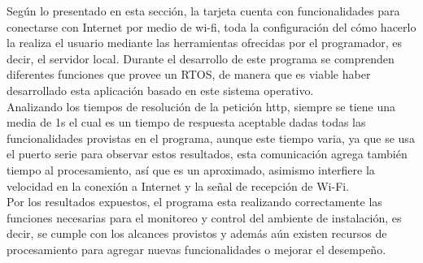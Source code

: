 Según lo presentado en esta sección, la tarjeta cuenta con funcionalidades para conectarse con Internet por medio de wi-fi, toda la configuración del cómo hacerlo la realiza el usuario mediante las herramientas ofrecidas por el programador, es decir, el servidor local. Durante el desarrollo de este programa se comprenden diferentes funciones que provee un RTOS, de manera que es viable haber desarrollado esta aplicación basado en este sistema operativo.\\

Analizando los tiempos de resolución de la petición http, siempre se tiene una media de 1s el cual es un tiempo de respuesta aceptable dadas todas las funcionalidades provistas en el programa, aunque este tiempo varia, ya que se usa el puerto serie para observar estos resultados, esta comunicación agrega también tiempo al procesamiento, así que es un aproximado, asimismo interfiere la velocidad en la conexión a Internet y la señal de recepción de Wi-Fi.\\

Por los resultados expuestos, el programa esta realizando correctamente las funciones necesarias para el monitoreo y control del ambiente de instalación, es decir, se cumple con los alcances provistos y además aún existen recursos de procesamiento para agregar nuevas funcionalidades o mejorar el desempeño.\\

